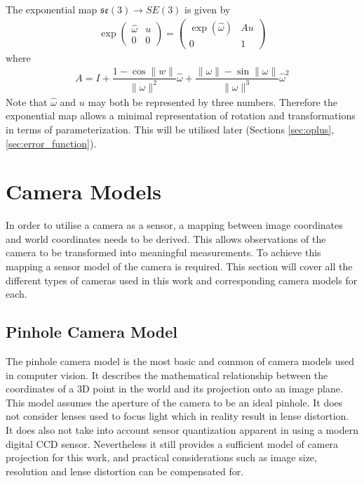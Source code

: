 The exponential map $\mathfrak{se}(3) \to SE(3)$ is given by
\begin{align}
 \exp\left(\begin{array}{cc}
             \hat\omega & u \\
             0 & 0  
           \end{array} \right) 
=
  \left(\begin{array}{cc}
          \exp(\hat\omega) & Au \\
          0 & 1 
        \end{array} \right)
\end{align}
where
\begin{align}
 A = I + \dfrac{1 - \cos\|w\|}{\|\omega\|^2}\hat\omega 
          + \dfrac{\|\omega\| - \sin\|\omega\|}
                  {\|\omega\|^3}\hat\omega^2
\end{align}
Note that $\hat\omega$ and $u$ may both be represented by three numbers.  Therefore the exponential map allows a minimal representation of rotation and transformations in terms of parameterization.  This will be utilised later (Sections \ref{sec:oplus}, \ref{sec:error_function}).

\section{Camera Models}
\label{sec:camera_models}
In order to utilise a camera as a sensor, a mapping between image coordinates and world coordinates needs to be derived.  This allows observations of the camera to be transformed into meaningful measurements.  To achieve this mapping a sensor model of the camera is required. This section will cover all the different types of cameras used in this work and corresponding camera models for each. 

\subsection{Pinhole Camera Model}
\label{subsec:pinhole_cam}


The pinhole camera model is the most basic and common of camera models used in computer vision.  It describes the mathematical relationship between the coordinates of a 3D point in the world and its projection onto an image plane.  This model assumes the aperture of the camera to be an ideal pinhole. It does not consider lenses used to focus light which in reality result in lense distortion.  It does also not take into account sensor quantization apparent in using a modern digital CCD sensor. Nevertheless it still provides a sufficient model of camera projection for this work, and practical considerations such as image size, resolution and lense distortion can be compensated for.


